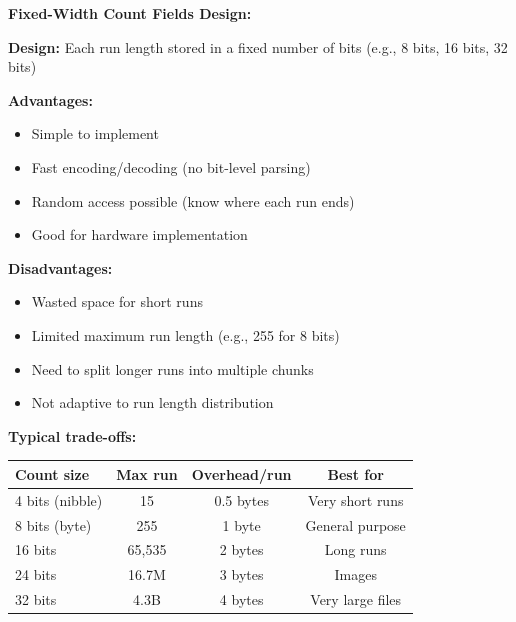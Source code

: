 \begin{importantbox}
\textbf{Fixed-Width Count Fields Design:}

\textbf{Design:} Each run length stored in a fixed number of bits (e.g., 8 bits, 16 bits, 32 bits)

\textbf{Advantages:}
\begin{itemize}
    \item Simple to implement
    \item Fast encoding/decoding (no bit-level parsing)
    \item Random access possible (know where each run ends)
    \item Good for hardware implementation
\end{itemize}

\textbf{Disadvantages:}
\begin{itemize}
    \item Wasted space for short runs
    \item Limited maximum run length (e.g., 255 for 8 bits)
    \item Need to split longer runs into multiple chunks
    \item Not adaptive to run length distribution
\end{itemize}

\textbf{Typical trade-offs:}

\begin{tabular}{|l|c|c|c|}
\hline
\textbf{Count size} & \textbf{Max run} & \textbf{Overhead/run} & \textbf{Best for} \\
\hline
4 bits (nibble) & 15 & 0.5 bytes & Very short runs \\
8 bits (byte) & 255 & 1 byte & General purpose \\
16 bits & 65,535 & 2 bytes & Long runs \\
24 bits & 16.7M & 3 bytes & Images \\
32 bits & 4.3B & 4 bytes & Very large files \\
\hline
\end{tabular}
\end{importantbox}

